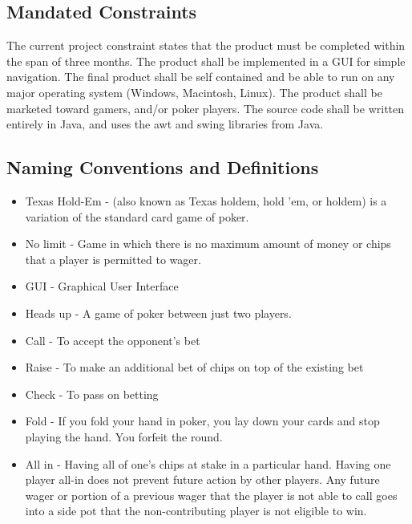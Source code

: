 \documentclass[12pt]{article}
\begin{document}
	\subsection{Mandated Constraints}
	The current project constraint states that the product must be completed within the 		span of three months. The product shall be implemented in a GUI for simple navigation. 		The final product shall be self contained and be able to run on any major operating 		system (Windows, Macintosh, Linux). The product shall be marketed toward gamers, and/or 	poker players. The source code shall be written entirely in Java, and uses the awt and 		swing libraries from Java.
	\subsection{Naming Conventions and Definitions}
	\begin{itemize}
	\item 	Texas Hold-Em -  (also known as Texas holdem, hold 'em, or holdem) is a 					variation of the standard card game of poker.
	\item 	No limit - Game in which there is no maximum amount of money or chips that a 				player is permitted to wager.
	\item	GUI - Graphical User Interface
	\item	Heads up - A game of poker between just two players.
	\item 	Call - To accept the opponent's bet
	\item 	Raise - To make an additional bet of chips on top of the existing bet
	\item 	Check - To pass on betting
	\item	Fold - If you fold your hand in poker, you lay down your cards and stop playing 			the hand. You forfeit the round.
	\item	All in - Having all of one's chips at stake in a particular hand. Having one 				player all-in does not prevent future action by other players. Any future wager 			or portion of a previous wager that the player is not able to call goes into a 				side pot that the non-contributing player is not eligible to win.
	\end{itemize}
\end{document}
